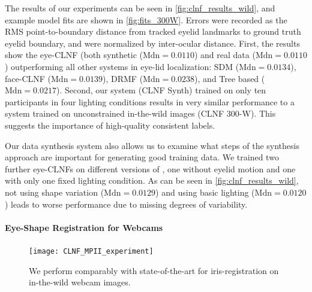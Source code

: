 The results of our experiments can be seen in \autoref{fig:clnf_results_wild}, and example model fits are shown in \autoref{fig:fits_300W}.
Errors were recorded as the RMS point-to-boundary distance from tracked eyelid landmarks to ground truth eyelid boundary, and were normalized by inter-ocular distance. 
First, the results show the eye-CLNF (both synthetic ($\mathrm{Mdn}=0.0110$) and real data ($\mathrm{Mdn}=0.0110$) outperforming all other systems in eye-lid localization: SDM ($\mathrm{Mdn}=0.0134$), face-CLNF ($\mathrm{Mdn}=0.0139$), DRMF ($\mathrm{Mdn}=0.0238$), and Tree based ($\mathrm{Mdn}=0.0217$). 
Second, our system (CLNF Synth) trained on only ten participants in four lighting conditions results in very similar performance to a system trained on unconstrained in-the-wild images (CLNF 300-W). This suggests the importance of high-quality consistent labels.

Our data synthesis system also allows us to examine what steps of the synthesis approach are important for generating good training data. We trained two further eye-CLNFs on different versions of \dataset, one without eyelid motion and one with only one fixed lighting condition. As can be seen in \autoref{fig:clnf_results_wild}, not using shape variation ($\mathrm{Mdn}=0.0129$) and using basic lighting ($\mathrm{Mdn}=0.0120$) leads to worse performance due to missing degrees of variability.

\paragraph{Eye-Shape Registration for Webcams}




\begin{figure}
    \centering
    \texttt{[image: CLNF\_MPII\_experiment]}
    \caption{We perform comparably with state-of-the-art for iris-registration on in-the-wild webcam images.}
    \label{fig:clnf_results_MPII}
\end{figure}

